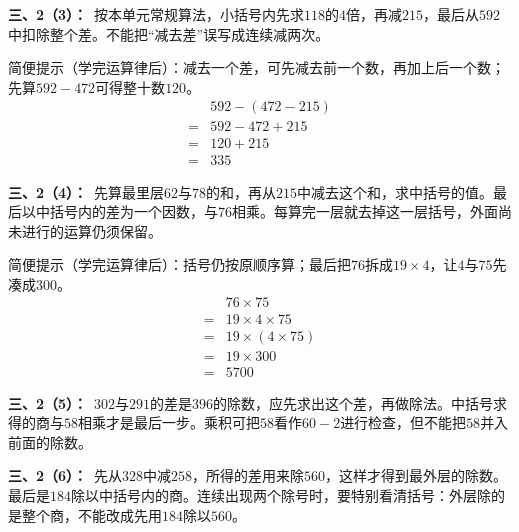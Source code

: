\documentclass[multi=snippet,border=0pt]{standalone}
\newenvironment{snippet}[3]{\begin{minipage}{#1bp}\color{answerred}\fontsize{#2}{#3}\selectfont\raggedright}{\end{minipage}}
\begin{document}
\begin{snippet}{505}{11.5}{14}\textbf{三、2（3）：}\ 按本单元常规算法，小括号内先求\(118\)的\(4\)倍，再减\(215\)，最后从\(592\)中扣除整个差。不能把“减去差”误写成连续减两次。\par 简便提示（学完运算律后）：减去一个差，可先减去前一个数，再加上后一个数；先算\(592-472\)可得整十数\(120\)。\[\begin{aligned}&592-(472-215)\\={}&592-472+215\\={}&120+215\\={}&335\end{aligned}\]\end{snippet}
\begin{snippet}{505}{11.5}{14}\textbf{三、2（4）：}\ 先算最里层\(62\)与\(78\)的和，再从\(215\)中减去这个和，求中括号的值。最后以中括号内的差为一个因数，与\(76\)相乘。每算完一层就去掉这一层括号，外面尚未进行的运算仍须保留。\par 简便提示（学完运算律后）：括号仍按原顺序算；最后把\(76\)拆成\(19\times4\)，让\(4\)与\(75\)先凑成\(300\)。\[\begin{aligned}&76\times75\\={}&19\times4\times75\\={}&19\times(4\times75)\\={}&19\times300\\={}&5700\end{aligned}\]\end{snippet}
\begin{snippet}{505}{11.5}{14}\textbf{三、2（5）：}\ \(302\)与\(291\)的差是\(396\)的除数，应先求出这个差，再做除法。中括号求得的商与\(58\)相乘才是最后一步。乘积可把\(58\)看作\(60-2\)进行检查，但不能把\(58\)并入前面的除数。\end{snippet}
\begin{snippet}{505}{11.5}{14}\textbf{三、2（6）：}\ 先从\(328\)中减\(258\)，所得的差用来除\(560\)，这样才得到最外层的除数。最后是\(184\)除以中括号内的商。连续出现两个除号时，要特别看清括号：外层除的是整个商，不能改成先用\(184\)除以\(560\)。\end{snippet}
\end{document}

